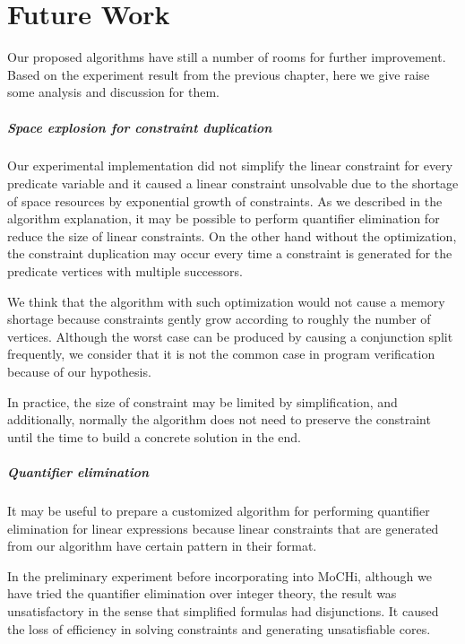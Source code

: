 ﻿\chapter{Future Work}
\label{chap:future}

Our proposed algorithms have still a number of rooms for further
improvement.  Based on the experiment result from the previous
chapter, here we give raise some analysis and discussion for them.


\paragraph{Space explosion for constraint duplication}
Our experimental implementation did not simplify the linear constraint
for every predicate variable and it caused a linear constraint
unsolvable due to the shortage of space resources by exponential
growth of constraints.  As we described in the algorithm explanation,
it may be possible to perform quantifier elimination for reduce the
size of linear constraints.  On the other hand without the
optimization, the constraint duplication may occur every time a
constraint is generated for the predicate vertices with multiple
successors.

We think that the algorithm with such optimization would not cause a
memory shortage because constraints gently grow according to roughly
the number of vertices.  Although the worst case can be produced by
causing a conjunction split frequently, we consider that it is not the
common case in program verification because of our hypothesis.

In practice, the size of constraint may be limited by simplification,
and additionally, normally the algorithm does not need to preserve the
constraint until the time to build a concrete solution in the end.


\paragraph{Quantifier elimination}
It may be useful to prepare a customized algorithm for performing
quantifier elimination for linear expressions because linear
constraints that are generated from our algorithm have certain pattern
in their format.

In the preliminary experiment before incorporating into MoCHi, although
we have tried the quantifier elimination over integer theory, the
result was unsatisfactory in the sense that simplified formulas had
disjunctions.  It caused the loss of efficiency in solving constraints
and generating unsatisfiable cores.

